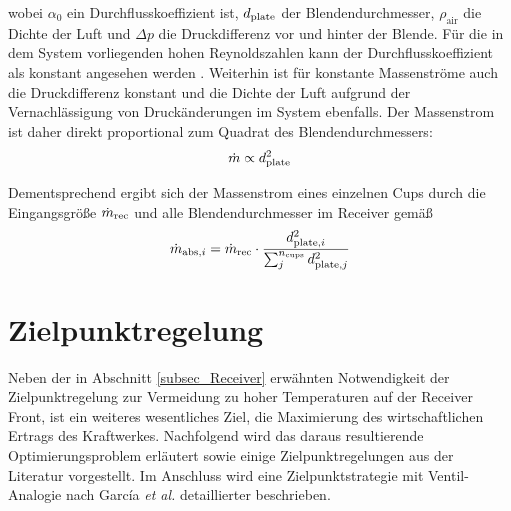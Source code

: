 \vspace*{-\baselineskip}wobei $\alpha_0$ ein Durchflusskoeffizient ist, $\OrificeDiameter$ der Blendendurchmesser, $\rho_{\mathrm{air}}$ die Dichte der Luft und $\Delta p$ die Druckdifferenz vor und hinter der Blende.
Für die in dem System vorliegenden hohen Reynoldszahlen kann der Durchflusskoeffizient als konstant angesehen werden \cite{IdingSolarPaces}.
Weiterhin ist für konstante Massenströme auch die Druckdifferenz konstant und die Dichte der Luft aufgrund der Vernachlässigung von Druckänderungen im System ebenfalls.
Der Massenstrom ist daher direkt proportional zum Quadrat des Blendendurchmessers:
\begin{equation} \label{eq_AbhängigkeitMassenstrom}
    \dot{m} \propto \OrificeDiameter^2
\end{equation}

Dementsprechend ergibt sich der Massenstrom eines einzelnen Cups durch die Eingangsgröße $\MDotReceiver$ und alle Blendendurchmesser im Receiver gemäß
\begin{equation} \label{eq_BerechnungMassenstrom}
    \dot{m}_{\IndexAbsorber, i} =\MDotReceiver \cdot \frac{\OrificeDiameter[,i]^2}{\sum_j^{n_{\mathrm{cups}}}\OrificeDiameter[,j]^2}
\end{equation}


\section{Zielpunktregelung} \label{sec_Zielpunktregelung}
Neben der in Abschnitt \ref{subsec_Receiver} erwähnten Notwendigkeit der Zielpunktregelung zur Vermeidung zu hoher Temperaturen auf der Receiver Front, ist ein weiteres wesentliches Ziel, die Maximierung des wirtschaftlichen Ertrags des Kraftwerkes.
Nachfolgend wird das daraus resultierende Optimierungsproblem erläutert sowie einige Zielpunktregelungen aus der Literatur vorgestellt.
Im Anschluss wird eine Zielpunktstrategie mit Ventil-Analogie nach García \textit{et al.} \cite{Garcia2} detaillierter beschrieben.

